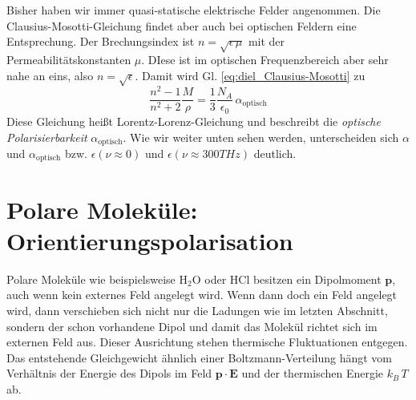 Bisher haben wir immer quasi-statische elektrische Felder angenommen.  Die Clausius-Mosotti-Gleichung findet aber auch bei optischen Feldern eine Entsprechung. Der Brechungsindex ist $n = \sqrt{\epsilon \, \mu}$ mit der Permeabilitätskonstanten $\mu$. DIese ist im optischen Frequenzbereich aber sehr nahe an eins, also $n = \sqrt{\epsilon }$. Damit wird Gl. \ref{eq:diel_Clausius-Mosotti} zu 
  \begin{equation}
 \frac{n^2 - 1}{n^2 + 2} \frac{M}{\rho} = \frac{1}{3} \frac{N_A}{\epsilon
_0} \, \alpha_\text{optisch} \label{eq:diel_Lorentz_Lorenz}
 \end{equation}
 Diese Gleichung heißt Lorentz-Lorenz-Gleichung und beschreibt die \emph{optische Polarisierbarkeit} $\alpha_\text{optisch}$. Wie wir weiter unten sehen werden, unterscheiden sich $\alpha$ und  $\alpha_\text{optisch}$ bzw. $\epsilon(\nu \approx 0)$ und $\epsilon(\nu \approx 300 THz)$ deutlich.
 
\section{Polare Moleküle: Orientierungspolarisation}
 
Polare Moleküle wie beispielsweise H$_2$O oder HCl besitzen ein Dipolmoment $\mathbf{p}$, auch wenn kein externes Feld angelegt wird. Wenn dann doch ein Feld angelegt wird, dann verschieben sich nicht nur die Ladungen wie im letzten Abschnitt, sondern der schon vorhandene Dipol und damit das Molekül richtet sich im externen Feld aus. Dieser Ausrichtung stehen thermische Fluktuationen entgegen. Das entstehende Gleichgewicht ähnlich einer Boltzmann-Verteilung hängt vom Verhältnis der Energie des Dipols im Feld $\mathbf{p} \cdot \mathbf{E}$ und der thermischen Energie $k_B \, T$ ab. 

